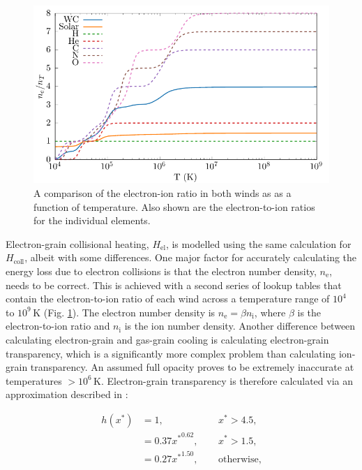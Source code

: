 \documentclass[fleqn,usenatbib]{mnras}
\newcommand{\rms}[1]{\ensuremath{_{\text{#1}}}}
\begin{document}
\begin{figure}
  \centering
  \includegraphics[width=\linewidth]{assets/ionisation-fraction/ionisation-fraction.pdf}
  \caption[OB and WR electron-ion ratios]{A comparison of the electron-ion ratio in both winds as as a function of temperature. Also shown are the electron-to-ion ratios for the individual elements.}
  \label{fig:electron-curve}
\end{figure}

Electron-grain collisional heating, $H_\text{el}$, is modelled using the same calculation for $H_\text{coll}$, albeit with some differences.
One major factor for accurately calculating the energy loss due to electron collisions is that the electron number density, $n\rms e$, needs to be correct.
This is achieved with a second series of lookup tables that contain the electron-to-ion ratio of each wind across a temperature range of $10^4$ to $10^9\,\si{\kelvin}$ (Fig. \ref{fig:electron-curve}).
The electron number density is $n \rms e = \beta n \rms i$, where $\beta$ is the electron-to-ion ratio and $n \rms i$ is the ion number density.
Another difference between calculating electron-grain and gas-grain cooling is calculating electron-grain transparency, which is a significantly more complex problem than calculating ion-grain transparency.
An assumed full opacity proves to be extremely inaccurate at temperatures $>10^6\,\si{\kelvin}$.
Electron-grain transparency is therefore calculated via an approximation described in \cite{dwek_infrared_1981}:

\begin{equation}
  \begin{alignedat}{3}
    h(x^*) & = 1 ,                && ~~ x^* > 4.5, \\
           & = 0.37{x^*}^{0.62} , && ~~ x^* > 1.5 , \\
           & = 0.27{x^*}^{1.50} , && ~~ \text{otherwise,}
  \end{alignedat}
\end{equation}
\end{document}
